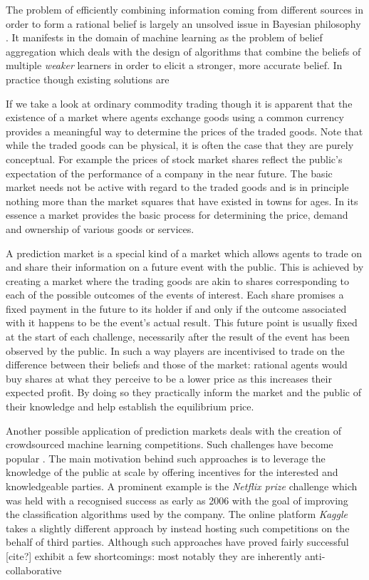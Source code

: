 \documentclass[bsc,frontabs,twoside,singlespacing,parskip,deptreport]{infthesis}     %
\begin{document}
The problem of efficiently combining information coming from different sources in order to form a rational belief is largely an unsolved issue in Bayesian philosophy \cite{greene_collective_2010}. It manifests in the domain of machine learning as the problem of belief aggregation which deals with the design of algorithms that combine the beliefs of multiple {\em weaker} learners in order to elicit a stronger, more accurate belief. In practice though existing solutions are 

	If we take a look at ordinary commodity trading though it is apparent that the existence of a market where agents exchange goods using a common currency provides a meaningful way to determine the prices of the traded goods. Note that while the traded goods can be physical, it is often the case that they are purely conceptual. For example the prices of stock market shares reflect the public's expectation of the performance of a company in the near future. The basic market needs not be active with regard to the traded goods and is in principle nothing more than the market squares that have existed in towns for ages. In its essence a market provides the basic process for determining the price, demand and ownership of various goods or services. 

	A prediction market is a special kind of a market which allows agents to trade on and share their information on a future event with the public. This is achieved by creating a market where the trading goods are akin to shares corresponding to each of the possible outcomes of the events of interest. Each share promises a fixed payment in the future to its holder if and only if the outcome associated with it happens to be the event's actual result. This future point is usually fixed at the start of each challenge, necessarily after the result of the event has been observed by the public. In such a way players are incentivised to trade on the difference between their beliefs and those of the market: rational agents would buy shares at what they perceive to be a lower price as this increases their expected profit. By doing so they practically inform the market and the public of their knowledge and help establish the equilibrium price. 

	Another possible application of prediction markets deals with the creation of crowdsourced machine learning competitions. Such challenges have become popular . The main motivation behind such approaches is to leverage the knowledge of the public at scale by offering incentives for the interested and knowledgeable parties. A prominent example is the {\em Netflix prize} challenge which was held with a recognised success as early as 2006 with the goal of improving the classification algorithms used by the company\cite{bennett_the_2007}. The online platform {\em Kaggle} takes a slightly different approach by instead hosting such competitions on the behalf of third parties. Although such approaches have proved fairly successful [cite?] exhibit a few shortcomings: most notably they are inherently anti-collaborative 
\end{document}
